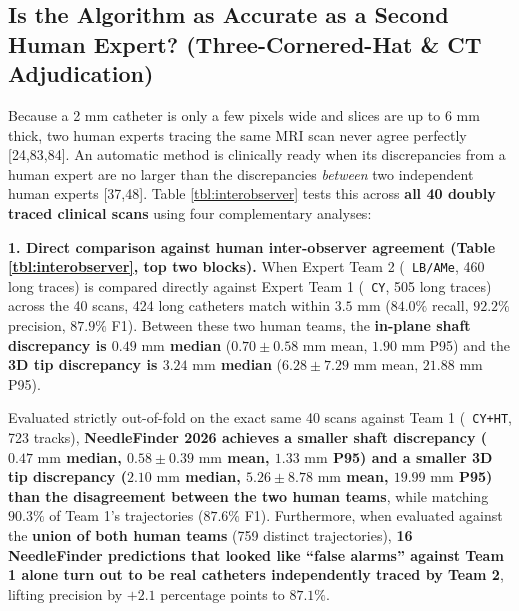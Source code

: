 \documentclass[
  11pt,
]{article}
\let\nforigtexttt\texttt
\renewcommand{\texttt}[1]{\nforigtexttt{\XeTeXinterchartokenstate=1 #1}}
\begin{document}
\FloatBarrier

\subsection{Is the Algorithm as Accurate as a Second Human Expert?
(Three-Cornered-Hat \& CT
Adjudication)}\label{is-the-algorithm-as-accurate-as-a-second-human-expert-three-cornered-hat-ct-adjudication}



Because a 2 mm catheter is only a few pixels wide and slices are up to 6
mm thick, two human experts tracing the same MRI scan never agree
perfectly {[}24,83,84{]}. An automatic method is clinically ready when
its discrepancies from a human expert are no larger than the
discrepancies \emph{between} two independent human experts {[}37,48{]}.
Table \ref{tbl:interobserver} tests this across \textbf{all 40 doubly
traced clinical scans} using four complementary analyses:

\textbf{1. Direct comparison against human inter-observer agreement
(Table \ref{tbl:interobserver}, top two blocks).} When Expert Team 2
(\texttt{LB/AMe}, 460 long traces) is compared directly against Expert
Team 1 (\texttt{CY}, 505 long traces) across the 40 scans, 424 long
catheters match within \(3.5\text{ mm}\) (\(84.0\%\) recall, \(92.2\%\)
precision, \(87.9\%\) F1). Between these two human teams, the
\textbf{in-plane shaft discrepancy is \(0.49\text{ mm}\) median}
(\(0.70 \pm 0.58\text{ mm}\) mean, \(1.90\text{ mm}\) P95) and the
\textbf{3D tip discrepancy is \(3.24\text{ mm}\) median}
(\(6.28 \pm 7.29\text{ mm}\) mean, \(21.88\text{ mm}\) P95).

Evaluated strictly out-of-fold on the exact same 40 scans against Team 1
(\texttt{CY+HT}, 723 tracks), \textbf{NeedleFinder 2026 achieves a
smaller shaft discrepancy (\(0.47\text{ mm}\) median,
\(0.58 \pm 0.39\text{ mm}\) mean, \(1.33\text{ mm}\) P95) and a smaller
3D tip discrepancy (\(2.10\text{ mm}\) median,
\(5.26 \pm 8.78\text{ mm}\) mean, \(19.99\text{ mm}\) P95) than the
disagreement between the two human teams}, while matching \(90.3\%\) of
Team 1's trajectories (\(87.6\%\) F1). Furthermore, when evaluated
against the \textbf{union of both human teams} (759 distinct
trajectories), \textbf{16 NeedleFinder predictions that looked like
``false alarms'' against Team 1 alone turn out to be real catheters
independently traced by Team 2}, lifting precision by \(+2.1\)
percentage points to \(87.1\%\).
\end{document}
